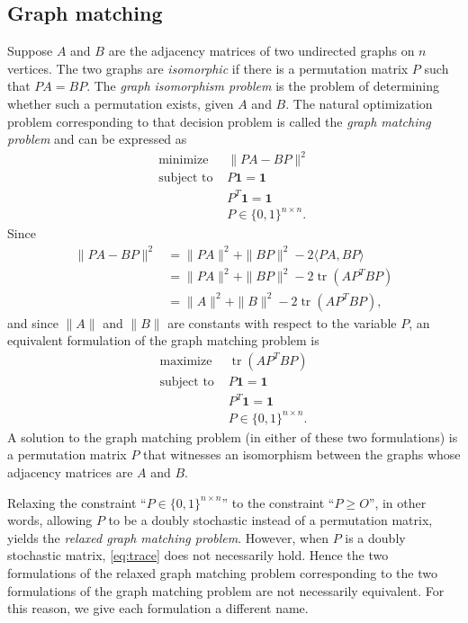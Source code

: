 \documentclass{article}
\newcommand{\1}{\mathbf{1}}
\DeclareMathOperator{\tr}{tr}
\begin{document}
\subsection{Graph matching}

Suppose $A$ and $B$ are the adjacency matrices of two undirected graphs on $n$ vertices.
The two graphs are \emph{isomorphic} if there is a permutation matrix $P$ such that $PA = BP$.
The \emph{graph isomorphism problem} is the problem of determining whether such a permutation exists, given $A$ and $B$.
The natural optimization problem corresponding to that decision problem is called the \emph{graph matching problem} and can be expressed as
\begin{align*}
  \text{minimize } & \|PA - BP\|^2 \\
  \text{subject to } & P \1 = \1 \\
  & P^T \1 = \1 \\
  & P \in \{0, 1\}^{n \times n}.
\end{align*}
Since
\begin{align}\label{eq:trace}
  \|PA - BP\|^2 & = \|PA\|^2 + \|BP\|^2 - 2 \langle PA, BP \rangle \nonumber \\
  & = \|PA\|^2 + \|BP\|^2 - 2 \tr(AP^TBP) \nonumber \\
  & = \|A\|^2 + \|B\|^2 - 2 \tr(AP^TBP),
\end{align}
and since $\|A\|$ and $\|B\|$ are constants with respect to the variable $P$, an equivalent formulation of the graph matching problem is
\begin{align*}
  \text{maximize } & \tr(AP^TBP) \\
  \text{subject to } & P \1 = \1 \\
  & P^T \1 = \1 \\
  & P \in \{0, 1\}^{n \times n}.
\end{align*}
A solution to the graph matching problem (in either of these two formulations) is a permutation matrix $P$ that witnesses an isomorphism between the graphs whose adjacency matrices are $A$ and $B$.

Relaxing the constraint ``$P \in \{0, 1\}^{n \times n}$'' to the constraint ``$P \geq O$'', in other words, allowing $P$ to be a doubly stochastic instead of a permutation matrix, yields the \emph{relaxed graph matching problem}.
However, when $P$ is a doubly stochastic matrix, \autoref{eq:trace} does not necessarily hold.
Hence the two formulations of the relaxed graph matching problem corresponding to the two formulations of the graph matching problem are not necessarily equivalent.
For this reason, we give each formulation a different name.
\end{document}
